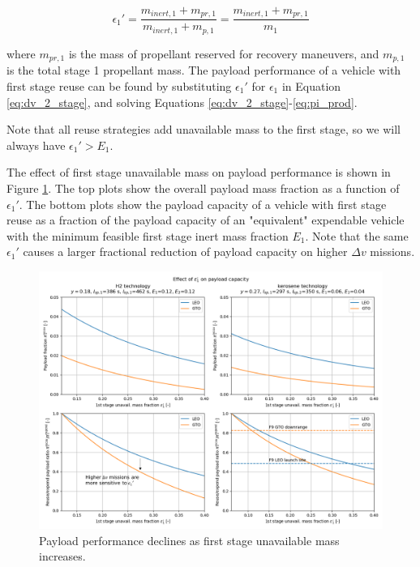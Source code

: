 \documentclass[conf]{new-aiaa}
\begin{document}
\begin{equation}
\label{eq:epsilon_1_prime}
\epsilon_1' = \frac{m_{inert,1} + m_{pr,1}}{m_{inert,1} + m_{p,1}} = \frac{m_{inert,1} + m_{pr,1}}{m_1}
\end{equation}

where $m_{pr,1}$ is the mass of propellant reserved for recovery maneuvers, and $m_{p,1}$ is the total stage 1 propellant mass.
The payload performance of a vehicle with first stage reuse can be found by substituting $\epsilon_1'$ for $\epsilon_1$ in Equation \ref{eq:dv_2_stage}, and solving Equations \ref{eq:dv_2_stage}-\ref{eq:pi_prod}.

Note that all reuse strategies add unavailable mass to the first stage, so we will always have $\epsilon_1' > E_1$.

The effect of first stage unavailable mass on payload performance is shown in Figure \ref{fig:payload_vs_unavail_mass}. The top plots show the overall payload mass fraction as a function of $\epsilon_1'$. The bottom plots show the payload capacity of a vehicle with first stage reuse as a fraction of the payload capacity of an "equivalent" expendable vehicle with the minimum feasible first stage inert mass fraction $E_1$. Note that the same $\epsilon_1'$ causes a larger fractional reduction of payload capacity on higher $\Delta v$ missions.

\begin{figure}[hbt!]
    \centering
    \includegraphics[width=\textwidth]{payload_vs_unavail_mass_annotated}
    \caption{\label{fig:payload_vs_unavail_mass} Payload performance declines as first stage unavailable mass increases.}
\end{figure}
\end{document}
